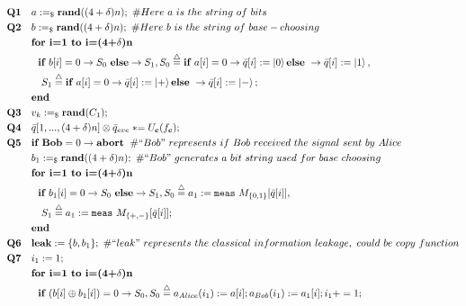 \documentclass{report}
\theoremstyle{defn_style}
\newcommand{\asteq}{\mathrel{*}=}
\begin{document}
\begin{tcolorbox}[colframe=black!75!black, colback=white, title=BB84 Protocol: Quantum Language Representation]

\begin{align*}
    \textbf{Q1} \quad & a:=_\$\textbf{rand}((4+\delta)n);~\#Here~a~is~the~string~of~bits\\
    \textbf{Q2} \quad & b:=_\$\textbf{rand}((4+\delta)n);~\#Here~b~is~the~string~of~base-choosing\\
    &\textbf{for~i=1~to~i=(4+$\delta$)n}\\
    &~~ \textbf{if }  b[i] = 0 \rightarrow S_0~ \textbf{else} \rightarrow S_1 ,S_0\stackrel{\triangle}{=}\textbf{if }  a[i] = 0 \rightarrow \bar{q}[i] :=\ket{0} \textbf{else}~\rightarrow  \bar{q}[i] :=\ket{1},\\
    &~~~S_1\stackrel{\triangle}{=}\textbf{if }  a[i] = 0 \rightarrow \bar{q}[i] :=\ket{+} \textbf{else}~\rightarrow  \bar{q}[i] :=\ket{-};\\
    &\textbf{end}\\
    \textbf{Q3} \quad & v_k:=_\$\textbf{rand}(C_1); \\
    \textbf{Q4} \quad &  \bar{q}[1,...,(4+\delta)n]\otimes \bar{q}_{eve}  \asteq U_{\textbf{c}}(f_{\textbf{c}}); \\
    \textbf{Q5} \quad 
    & \textbf{if }  \textbf{Bob} = 0 \rightarrow \textbf{abort} \; ~\# ``Bob"~represents~if~Bob~received~the~signal~sent~by~Alice \\
    & b_1:=_\$\textbf{rand}((4+\delta)n);~\# ``Bob"~generates~a~bit~string~used~for~base~choosing \\
    &\textbf{for~i=1~to~i=(4+$\delta$)n}\\
    &~~ \textbf{if }  b_1[i] = 0 \rightarrow S_0~ \textbf{else} \rightarrow S_1 ,S_0\stackrel{\triangle}{=}a_1:=\texttt{meas}
    ~ M_{\{0,1\}}[\bar{q}[i]],\\
    &~~~S_1\stackrel{\triangle}{=}a_1:=\texttt{meas}
    ~ M_{\{+,-\}}[\bar{q}[i]];\\
    &\textbf{end}\\
    \textbf{Q6} \quad & \textbf{leak} := \{b, b_1\}; ~\# ``leak"~represents~the~classical~information~leakage,~could~be~copy~function \\
    \textbf{Q7} \quad &i_1:=1;\\
    &\textbf{for~i=1~to~i=(4+$\delta$)n}\\
    &~~ \textbf{if }  (b[i]\oplus b_1[i]) = 0 \rightarrow S_0 ,S_0\stackrel{\triangle}{=}a_{Alice}(i_1):=a[i];a_{Bob}(i_1):=a_1[i];i_1+=1;\\

\end{align*}
\end{tcolorbox}
\end{document}
